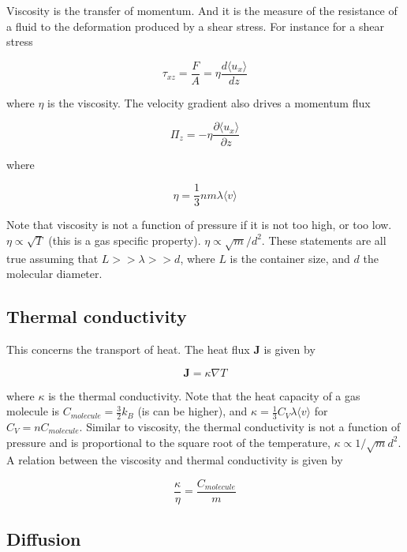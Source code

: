 \documentclass[a4paper]{article}
\begin{document}
Viscosity is the transfer of momentum. And it is the measure of the resistance of a fluid to the deformation produced by a shear stress. For instance for a shear stress 

\begin{equation}
	\tau_{xz}=\frac{F}{A}=\eta\frac{d\langle u_x\rangle}{dz}
\end{equation}

where $\eta$ is the viscosity. The velocity gradient also drives a momentum flux

\begin{equation}
	\Pi_z=-\eta\frac{\partial\langle u_x\rangle}{\partial z}
\end{equation}

where

\begin{equation}
	\eta = \frac{1}{3}nm\lambda\langle v\rangle
\end{equation}

Note that viscosity is not a function of pressure if it is not too high, or too low. $\eta\propto\sqrt{T}$ (this is a gas specific property). $\eta\propto \sqrt{m}/d^2$. These statements are all true assuming that $L>>\lambda>>d$, where $L$ is the container size, and $d$ the molecular diameter.

\subsection{Thermal conductivity}

This concerns the transport of heat. The heat flux $\bm{J}$ is given by

\begin{equation}
	\bm{J}=\kappa\nabla T
\end{equation} 

where $\kappa$ is the thermal conductivity. Note that the heat capacity of a gas molecule is $C_{molecule}=\frac{3}{2}k_B$ (is can be higher), and $\kappa=\frac{1}{3}C_V\lambda\langle v\rangle$ for $C_V=nC_{molecule}$. Similar to viscosity, the thermal conductivity is not a function of pressure and is proportional to the square root of the temperature, $\kappa\propto1/\sqrt{m}d^2$. A relation between the viscosity and thermal conductivity is given by

\begin{equation}
	\frac{\kappa}{\eta}=\frac{C_{molecule}}{m}
\end{equation}

\subsection{Diffusion}
\end{document}
